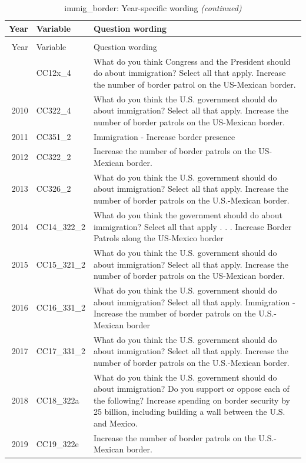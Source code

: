 \documentclass[12pt]{article}
\begin{document}
\begin{longtable}[t]{rl>{\raggedright\arraybackslash}p{10cm}}
\caption{\label{tab:unnamed-chunk-4}immig\_border: Year-specific wording}\\
\toprule
Year & Variable & Question wording\\
\midrule
\endfirsthead
\caption[]{immig\_border: Year-specific wording \textit{(continued)}}\\
\toprule
Year & Variable & Question wording\\
\midrule
\endhead
\
\endfoot
\bottomrule
\endlastfoot
2007 & CC12x\_4 & What do you think Congress and the President should do about immigration? Select all that apply. Increase the number of border patrol on the US-Mexican border.\\
2010 & CC322\_4 & What do you think the U.S. government should do about immigration? Select all that apply. Increase the number of border patrols on the US-Mexican border.\\
2011 & CC351\_2 & Immigration - Increase border presence\\
2012 & CC322\_2 & Increase the number of border patrols on the US-Mexican border.\\
2013 & CC326\_2 & What do you think the U.S. government should do about immigration? Select all that apply. Increase the number of border patrols on the U.S.-Mexican border.\\
2014 & CC14\_322\_2 & What do you think the government should do about immigration? Select all that apply . . . Increase Border Patrols along the US-Mexico border\\
2015 & CC15\_321\_2 & What do you think the U.S. government should do about immigration? Select all that apply. Increase the number of border patrols on the US-Mexican border.\\
2016 & CC16\_331\_2 & What do you think the U.S. government should do about immigration? Select all that apply. Immigration - Increase the number of border patrols on the U.S.-Mexican border\\
2017 & CC17\_331\_2 & What do you think the U.S. government should do about immigration? Select all that apply. Increase the number of border patrols on the U.S.-Mexican border.\\
2018 & CC18\_322a & What do you think the U.S. government should do about immigration? Do you support or oppose each of the following? Increase spending on border security by 25 billion, including building a wall between the U.S. and Mexico.\\
2019 & CC19\_322e & Increase the number of border patrols on the U.S.-Mexican border.\\*
\end{longtable}
\end{document}
